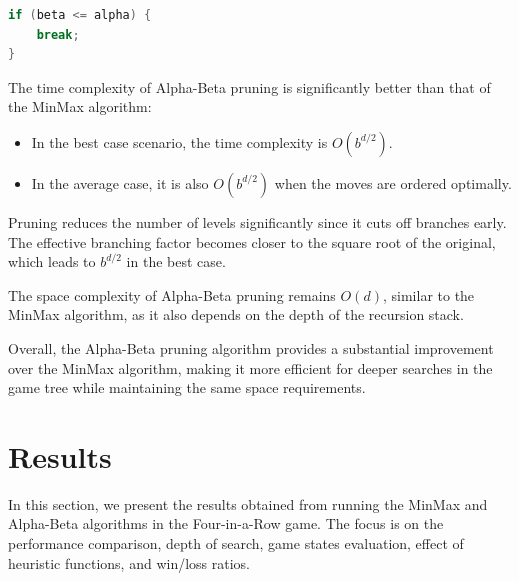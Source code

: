 \documentclass[11pt,a4paper]{article}
\begin{document}
\begin{lstlisting}[language=Java,basicstyle=\ttfamily\small,frame=single]
if (beta <= alpha) {
    break;
}
\end{lstlisting}

The time complexity of Alpha-Beta pruning is significantly better than that of the MinMax algorithm:
\begin{itemize}
    \item In the best case scenario, the time complexity is $O(b^{d/2})$.
    \item In the average case, it is also $O(b^{d/2})$ when the moves are ordered optimally.
\end{itemize}

Pruning reduces the number of levels significantly since it cuts off branches early. The effective branching factor becomes closer to the square root of the original, which leads to $b^{d/2}$ in the best case.

The space complexity of Alpha-Beta pruning remains $O(d)$, similar to the MinMax algorithm, as it also depends on the depth of the recursion stack.

Overall, the Alpha-Beta pruning algorithm provides a substantial improvement over the MinMax algorithm, making it more efficient for deeper searches in the game tree while maintaining the same space requirements.

\section{Results}
In this section, we present the results obtained from running the MinMax and Alpha-Beta algorithms in the Four-in-a-Row game. The focus is on the performance comparison, depth of search, game states evaluation, effect of heuristic functions, and win/loss ratios.
\end{document}
